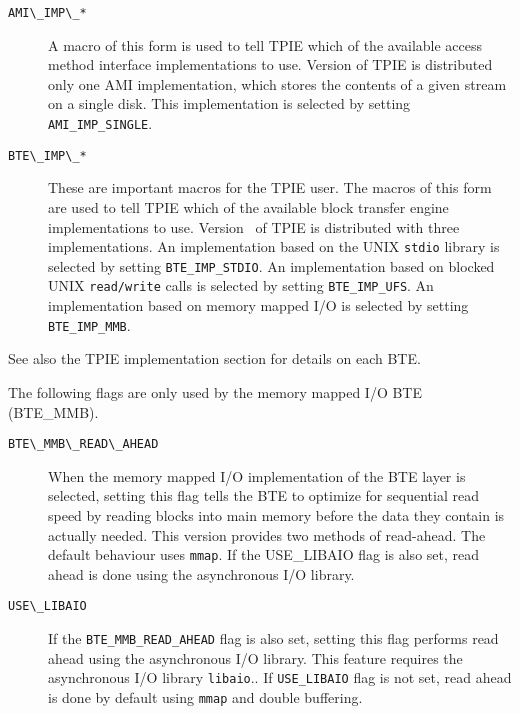 \begin{description}
\item[{\verb|AMI\_IMP\_*|}]
  A macro of this form is used to tell TPIE which of the available
  access method interface implementations to use.  Version \version of
  TPIE is distributed only one AMI implementation, which stores the
  contents of a given stream on a single disk.  This implementation is
  selected by setting 
  {\tt AMI\_IMP\_SINGLE}.

\item[{\verb|BTE\_IMP\_*|}]
  These are important macros for the TPIE user.
  The macros of this form are used to tell TPIE which of the available
  block transfer engine implementations to use.  Version \version ~of
  TPIE is distributed with three implementations.  
  An implementation
  based on the UNIX {\tt stdio} library
   is selected
  by setting {\tt BTE\_IMP\_STDIO}.  
  An implementation based on blocked UNIX {\tt read/write} calls 
   is selected by setting 
  {\tt BTE\_IMP\_UFS}.
  An implementation based on memory
  mapped I/O is selected by setting 
  {\tt BTE\_IMP\_MMB}.
  

\end{description}

See also the TPIE implementation section for details on each BTE.

The following flags are only used by the memory mapped I/O BTE (BTE\_MMB).

\begin{description}

\item[{\verb|BTE\_MMB\_READ\_AHEAD|}]
  When the memory mapped I/O implementation of the BTE layer is
  selected, setting this flag tells the BTE to optimize for sequential
  read speed by reading blocks into main memory before the
  data they contain is actually needed. This version provides two methods
  of read-ahead. The default behaviour uses {\tt mmap}. If the USE\_LIBAIO
  flag is also set, read ahead is done using the asynchronous I/O library.
  
\item[{\verb|USE\_LIBAIO|}]  If the
  \verb|BTE_MMB_READ_AHEAD| flag is also set, setting this flag performs read
  ahead using the asynchronous I/O library.  This feature requires the
  asynchronous I/O library {\tt libaio}.. If {\verb|USE_LIBAIO|} flag is not set, read ahead is done
  by default using {\tt mmap} and double buffering.

\end{description}

